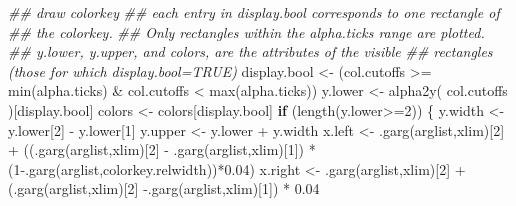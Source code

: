 \documentclass[
  letterpaper,
  DIV=11,
  numbers=noendperiod]{scrartcl}
\newenvironment{Shaded}{\begin{snugshade}}{\end{snugshade}}
\newcommand{\ControlFlowTok}[1]{\textcolor[rgb]{0.00,0.23,0.31}{\textbf{#1}}}
\newcommand{\DecValTok}[1]{\textcolor[rgb]{0.68,0.00,0.00}{#1}}
\newcommand{\DocumentationTok}[1]{\textcolor[rgb]{0.37,0.37,0.37}{\textit{#1}}}
\newcommand{\FloatTok}[1]{\textcolor[rgb]{0.68,0.00,0.00}{#1}}
\newcommand{\FunctionTok}[1]{\textcolor[rgb]{0.28,0.35,0.67}{#1}}
\newcommand{\NormalTok}[1]{\textcolor[rgb]{0.00,0.23,0.31}{#1}}
\newcommand{\OtherTok}[1]{\textcolor[rgb]{0.00,0.23,0.31}{#1}}
\newcommand{\SpecialCharTok}[1]{\textcolor[rgb]{0.37,0.37,0.37}{#1}}
\newcommand{\StringTok}[1]{\textcolor[rgb]{0.13,0.47,0.30}{#1}}
\begin{document}
\begin{Shaded}
\begin{Highlighting}[]
            \DocumentationTok{\#\# draw colorkey}
            \DocumentationTok{\#\# each entry in display.bool corresponds to one rectangle of}
            \DocumentationTok{\#\# the colorkey.}
            \DocumentationTok{\#\# Only rectangles within the alpha.ticks range are plotted.}
            \DocumentationTok{\#\# y.lower, y.upper, and colors, are the attributes of the visible}
            \DocumentationTok{\#\# rectangles (those for which display.bool=TRUE)}
\NormalTok{            display.bool }\OtherTok{\textless{}{-}}\NormalTok{ (col.cutoffs }\SpecialCharTok{\textgreater{}=} \FunctionTok{min}\NormalTok{(alpha.ticks) }\SpecialCharTok{\&}
\NormalTok{                             col.cutoffs }\SpecialCharTok{\textless{}} \FunctionTok{max}\NormalTok{(alpha.ticks))}
\NormalTok{            y.lower }\OtherTok{\textless{}{-}} \FunctionTok{alpha2y}\NormalTok{( col.cutoffs )[display.bool]}
\NormalTok{            colors }\OtherTok{\textless{}{-}}\NormalTok{ colors[display.bool]}
            \ControlFlowTok{if}\NormalTok{ (}\FunctionTok{length}\NormalTok{(y.lower}\SpecialCharTok{\textgreater{}=}\DecValTok{2}\NormalTok{)) \{}
\NormalTok{                y.width }\OtherTok{\textless{}{-}}\NormalTok{ y.lower[}\DecValTok{2}\NormalTok{] }\SpecialCharTok{{-}}\NormalTok{ y.lower[}\DecValTok{1}\NormalTok{]}
\NormalTok{                y.upper }\OtherTok{\textless{}{-}}\NormalTok{ y.lower }\SpecialCharTok{+}\NormalTok{ y.width}
\NormalTok{                x.left }\OtherTok{\textless{}{-}} \FunctionTok{.garg}\NormalTok{(arglist,}\StringTok{\textquotesingle{}xlim\textquotesingle{}}\NormalTok{)[}\DecValTok{2}\NormalTok{] }\SpecialCharTok{+}
\NormalTok{                  ((}\FunctionTok{.garg}\NormalTok{(arglist,}\StringTok{\textquotesingle{}xlim\textquotesingle{}}\NormalTok{)[}\DecValTok{2}\NormalTok{] }\SpecialCharTok{{-}} \FunctionTok{.garg}\NormalTok{(arglist,}\StringTok{\textquotesingle{}xlim\textquotesingle{}}\NormalTok{)[}\DecValTok{1}\NormalTok{]) }\SpecialCharTok{*}
\NormalTok{                   (}\DecValTok{1}\SpecialCharTok{{-}}\FunctionTok{.garg}\NormalTok{(arglist,}\StringTok{\textquotesingle{}colorkey.relwidth\textquotesingle{}}\NormalTok{))}\SpecialCharTok{*}\FloatTok{0.04}\NormalTok{)}
\NormalTok{                x.right }\OtherTok{\textless{}{-}} \FunctionTok{.garg}\NormalTok{(arglist,}\StringTok{\textquotesingle{}xlim\textquotesingle{}}\NormalTok{)[}\DecValTok{2}\NormalTok{] }\SpecialCharTok{+}
\NormalTok{                  (}\FunctionTok{.garg}\NormalTok{(arglist,}\StringTok{\textquotesingle{}xlim\textquotesingle{}}\NormalTok{)[}\DecValTok{2}\NormalTok{] }\SpecialCharTok{{-}}\FunctionTok{.garg}\NormalTok{(arglist,}\StringTok{\textquotesingle{}xlim\textquotesingle{}}\NormalTok{)[}\DecValTok{1}\NormalTok{]) }\SpecialCharTok{*} \FloatTok{0.04}

\end{Highlighting}
\end{Shaded}
\end{document}
